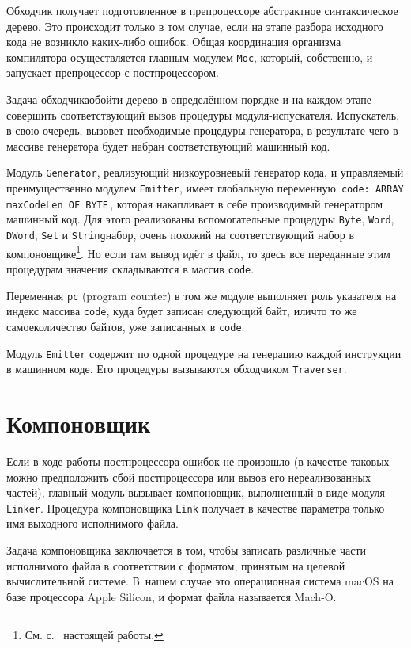 \documentclass[utf8]{lgu}
\newcommand{\tire}{\unskip\nobreak\thinspace\textemdash\thinspace}
\newcommand{\code}[1]{{\normalsize\texttt{#1}}}
\begin{document}
Обходчик получает подготовленное в препроцессоре абстрактное синтаксическое дерево. Это происходит только в том случае, если на этапе разбора исходного кода не возникло каких-либо ошибок. Общая координация организма компилятора осуществляется главным модулем \code{Moc}, который, собственно, и запускает препроцессор с постпроцессором.

Задача обходчика\tire обойти дерево в определённом порядке и на каждом этапе совершить соответствующий вызов процедуры модуля-испускателя. Испускатель, в свою очередь, вызовет необходимые процедуры генератора, в результате чего в массиве генератора будет набран соответствующий машинный код.

Модуль \code{Generator}, реализующий низкоуровневый генератор кода, и управляемый преимущественно модулем \code{Emitter}, имеет глобальную переменную \,\code{code: ARRAY maxCodeLen OF BYTE}\,, которая накапливает в себе производимый генератором машинный код. Для этого реализованы вспомогательные процедуры \code{Byte}, \code{Word}, \code{DWord}, \code{Set} и \code{String}\tire набор, очень похожий на соответствующий набор в компоновщике\footnote{См. с.~\pageref{Linker} настоящей работы.}. Но если там вывод идёт в файл, то здесь все переданные этим процедурам значения складываются в 
массив \code{code}.

Переменная \code{pc} (program counter) в том же модуле выполняет роль указателя на индекс массива \code{code}, куда будет записан следующий байт, или\tire что то же самое\tire количество байтов, уже записанных в \code{code}.

Модуль \code{Emitter} содержит по одной процедуре на генерацию каждой инструкции в машинном коде. Его процедуры вызываются обходчиком \code{Traverser}.

\section{Компоновщик}

\firstparskip Если в ходе работы постпроцессора ошибок не произошло (в качестве таковых можно предположить сбой постпроцессора или вызов его нереализованных частей), главный модуль вызывает компоновщик, выполненный в виде модуля \code{Linker}. Процедура компоновщика \code{Link} получает в качестве параметра только имя выходного исполнимого файла.

Задача компоновщика заключается в том, чтобы записать различные части исполнимого файла в соответствии с форматом, принятым на целевой вычислительной системе. В~нашем случае это операционная система macOS на базе процессора Apple Silicon, и формат файла называется Mach‑O.
\end{document}
